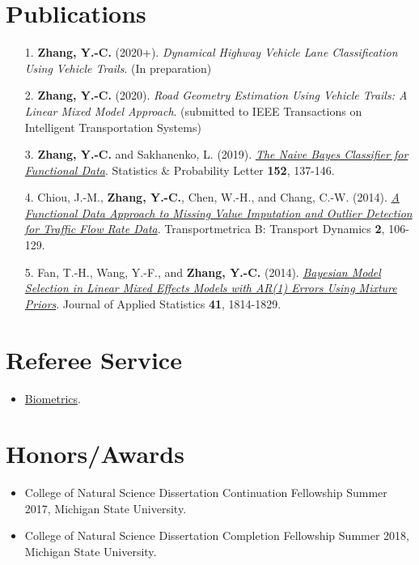 \documentclass[a4paper,10pt,dvipdfmx]{article}
\begin{document}
\section*{Publications}
\begin{itemize}[noitemsep,nolistsep]
  \item[1.] \textbf{Zhang, Y.-C.} (2020+). \textit{Dynamical Highway Vehicle Lane Classification Using Vehicle Trails}. (In preparation)
  \item[2.] \textbf{Zhang, Y.-C.} (2020). \textit{Road Geometry Estimation Using Vehicle Trails: A Linear Mixed Model Approach}. (submitted to IEEE Transactions on Intelligent Transportation Systems)
  \item[3.] \textbf{Zhang, Y.-C.} and Sakhanenko, L. (2019). \href{https://www.sciencedirect.com/science/article/pii/S0167715219301208}{\textit{The Naive Bayes Classifier for Functional Data}}. Statistics \& Probability Letter \textbf{152}, 137-146.
  \item[4.] Chiou, J.-M., \textbf{Zhang, Y.-C.}, Chen, W.-H., and Chang, C.-W. (2014). \href{http://www.tandfonline.com/doi/abs/10.1080/21680566.2014.892847}{\textit{A Functional Data Approach to Missing Value Imputation and Outlier Detection for Traffic Flow Rate Data}}. Transportmetrica B: Transport Dynamics \textbf{2}, 106-129.
  \item[5.] Fan, T.-H., Wang, Y.-F., and \textbf{Zhang, Y.-C.} (2014). \href{http://www.tandfonline.com/doi/abs/10.1080/02664763.2014.894001?journalCode=cjas20}{\textit{Bayesian Model Selection in Linear Mixed Effects Models with AR(1) Errors Using Mixture Priors}}. Journal of Applied Statistics \textbf{41}, 1814-1829.
\end{itemize}

\section*{Referee Service}
\begin{itemize}[noitemsep,nolistsep]
  \item \href{https://chris7462.github.io/BIOM_Reviewer_Certificate.pdf}{Biometrics}.
\end{itemize}

\section*{Honors/Awards}
\begin{itemize}[noitemsep,nolistsep]
  \item College of Natural Science Dissertation Continuation Fellowship Summer 2017, Michigan State University.
  \item College of Natural Science Dissertation Completion Fellowship Summer 2018, Michigan State University.
\end{itemize}
\end{document}
